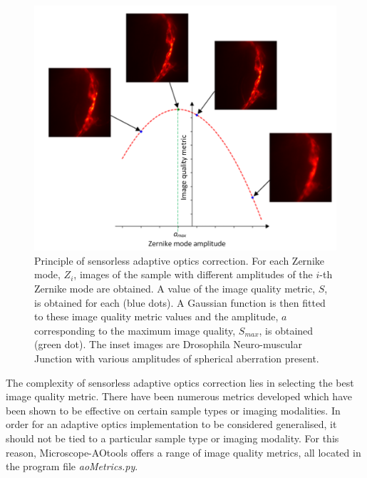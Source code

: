 \begin{figure}[h]
	\centering
	\includegraphics[width=1\textwidth,scale=0.5]{./images/sensorless_aberration_fitting_w_images.png}
	\caption[Principle of sensorless adaptive optics correction.]{Principle of sensorless adaptive optics correction. For each Zernike mode, $Z_i$, images of the sample with different amplitudes of the $i$-th Zernike mode are obtained. A value of the image quality metric, $S$, is obtained for each (blue dots). A Gaussian function is then fitted to these image quality metric values and the amplitude, $a$ corresponding to the maximum image quality, $S_{max}$, is obtained (green dot). The inset images are Drosophila Neuro-muscular Junction with various amplitudes of spherical aberration present.}
	\label{fig:sensorless_correction_method}
\end{figure}

The complexity of sensorless adaptive optics correction lies in
selecting the best image quality metric. There have been numerous
metrics developed which have been shown to be effective on certain
sample types or imaging
modalities\cite{burke2015adaptive,booth2002adaptive,fienup2003aberration,debarre2008adaptive}. In
order for an adaptive optics implementation to be considered
generalised, it should not be tied to a particular sample type or
imaging modality. For this reason, Microscope-AOtools offers a range
of image quality metrics, all located in the program file \textit{aoMetrics.py}.  

